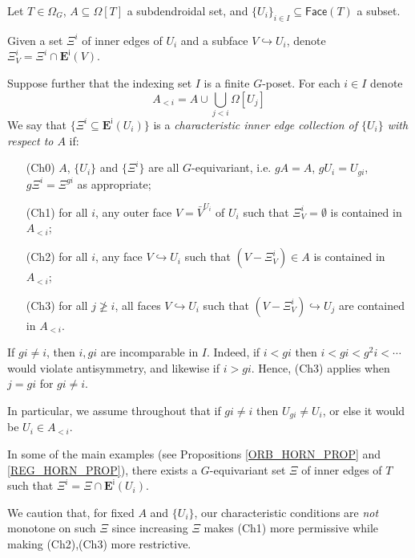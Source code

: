 \documentclass[a4paper,10pt
,draft
]{article}%
\begin{document}
\begin{definition}\label{CHAREDGE DEF}
	Let $T \in \Omega_G$, $A \subseteq \Omega[T]$ a subdendroidal set, and $\{U_i\}_{i \in I} \subseteq \mathsf{Face}(T)$ a subset.

	Given a set $\Xi^i$ of inner edges of $U_i$ and a subface $V \hookrightarrow U_i$, denote $\Xi_V^i = \Xi^i \cap \boldsymbol{E}^{\mathsf{i}}(V)$.

	Suppose further that the indexing set $I$ is a 
	finite $G$-poset. For each $i \in I$ denote
\[
	A_{<i} = A \cup \bigcup_{j<i} \Omega[U_j]
\]
	We say that $\{\Xi^i \subseteq \boldsymbol{E}^{\mathsf{i}}(U_i)\}$
	is a \textit{characteristic inner edge collection of $\{U_i\}$ with respect to $A$} if:
	\begin{itemize}
	\item[(Ch0)] $A$, $\{U_i\}$ and $\{\Xi^i\}$ are all $G$-equivariant, i.e. $g A = A$, $g U_i = U_{gi}$, $g \Xi^i = \Xi^{gi}$ as appropriate; 
	\item[(Ch1)] for all $i$, any outer face $V = \bar{V}^{U_i}$
		of $U_i$ such that $\Xi_{V}^i = \emptyset$
		is contained in $A_{<i}$;
	\item[(Ch2)] for all $i$, any face
		$V \hookrightarrow U_i$ such that $(V-\Xi_V^i) \in A$
		is contained in $A_{<i}$;
	\item[(Ch3)] for all $j \not \geq i$, 
		all faces $V \hookrightarrow U_i$ such that 
		$(V-\Xi^i_V) \hookrightarrow U_j$
		are contained in $A_{<i}$.
	\end{itemize}
\end{definition}


\begin{remark}\label{XIIII REM}
If $g i \neq i$, then $i,g i$ are incomparable in $I$. Indeed, if $i<gi$ then $i<gi<g^2i<\cdots$ would violate antisymmetry, and likewise if $i>gi$.
Hence, (Ch3) applies when $j=gi$ for $gi\neq i$.

In particular, we assume throughout that if
$gi \neq i$ then $U_{gi} \neq U_i$,
or else it would be $U_i \in A_{<i}$.
\end{remark}


\begin{remark}\label{SOMEMAIN REM}
In some of the main examples (see Propositions \ref{ORB_HORN_PROP} and \ref{REG_HORN_PROP}), there exists a $G$-equivariant set 
$\Xi$ of inner edges of $T$ such that $\Xi^i = \Xi \cap \boldsymbol{E}^{\mathsf{i}}(U_i)$.
	
We caution that, for fixed $A$ and $\{U_i\}$, our characteristic conditions are \textit{not} monotone on such $\Xi$ since increasing $\Xi$ makes (Ch1) more permissive while making (Ch2),(Ch3) more restrictive.
\end{remark}
\end{document}
